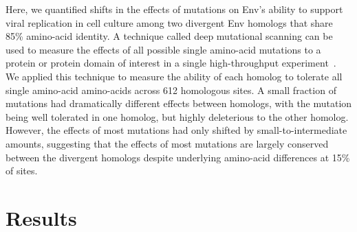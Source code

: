 \documentclass[9pt]{elife}
\begin{document}
Here, we quantified shifts in the effects of mutations on Env's ability to support viral replication in cell culture among two divergent Env homologs that share 85\% amino-acid identity.
A technique called deep mutational scanning can be used to measure the effects of all possible single amino-acid mutations to a protein or protein domain of interest in a single high-throughput experiment~\cite{mclaughlin2012spatial,roscoe2013analyses,firnberg2014comprehensive,olson2014comprehensive,melnikov2014comprehensive,bloom2014experimentally,qi2014quantitative,thyagarajan2014inherent,stiffler2015evolvability,doud2015site,kitzman2015massively,mishra2016systematic,doud2016accurate,mavor2015determination}.
We applied this technique to measure the ability of each homolog to tolerate all single amino-acid amino-acids across 612 homologous sites.
A small fraction of mutations had dramatically different effects between homologs, with the mutation being well tolerated in one homolog, but highly deleterious to the other homolog.
However, the effects of most mutations had only shifted by small-to-intermediate amounts, suggesting that the effects of most mutations are largely conserved between the divergent homologs despite underlying amino-acid differences at 15\% of sites.

\section{Results}
\end{document}
